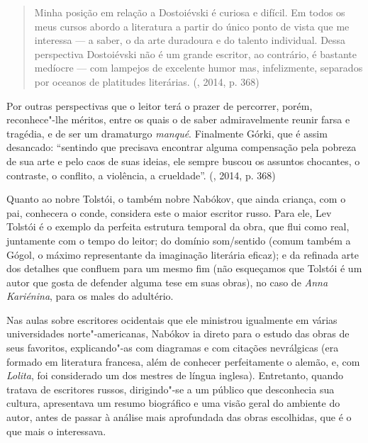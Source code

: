 {\begin{quote}
Minha posição em relação a Dostoiévski é curiosa e difícil. Em todos os meus
cursos abordo a literatura a partir do único ponto de vista que me
interessa --- a saber, o da arte duradoura e do talento individual. Dessa
perspectiva Dostoiévski não é um grande escritor, ao contrário, é
bastante medíocre --- com lampejos de excelente humor mas, infelizmente,
separados por oceanos de platitudes literárias.
(, 2014, p. 368)
\end{quote}

Por outras perspectivas que o leitor terá o prazer de percorrer, porém,
reconhece"-lhe méritos, entre os quais o de saber admiravelmente reunir
farsa e tragédia, e de ser um dramaturgo \emph{manqué}. Finalmente
Górki, que é assim desancado: ``sentindo que precisava encontrar alguma
compensação pela pobreza de sua arte e pelo caos de suas ideias, ele
sempre buscou os assuntos chocantes, o contraste, o conflito, a
violência, a crueldade''. (, 2014, p. 368)

Quanto ao nobre Tolstói, o também nobre Nabókov, que ainda criança,
com o pai, conhecera o conde, considera este o maior escritor
russo. Para ele, Lev Tolstói é o exemplo da perfeita estrutura temporal da obra, que
flui como real, juntamente com o tempo do leitor; do domínio som/sentido
(comum também a Gógol, o máximo representante da imaginação literária
eficaz); e da refinada arte dos detalhes que confluem para um mesmo fim (não
esqueçamos que Tolstói é um autor que gosta de defender alguma tese em suas
obras), no caso de \emph{Anna Kariénina}, para os males do adultério.

Nas aulas sobre escritores ocidentais que ele ministrou igualmente em
várias universidades norte"-americanas, Nabókov ia direto para o estudo das
obras de seus favoritos, explicando"-as com diagramas e com citações
nevrálgicas (era formado em literatura francesa, além de conhecer
perfeitamente o alemão, e, com \emph{Lolita}, foi considerado um dos
mestres de língua inglesa). Entretanto, quando tratava de escritores
russos, dirigindo"-se a um público que desconhecia sua
cultura, apresentava um resumo biográfico e uma visão geral do ambiente
do autor, antes de passar à análise mais aprofundada das
obras escolhidas, que é o que mais o interessava.

}
